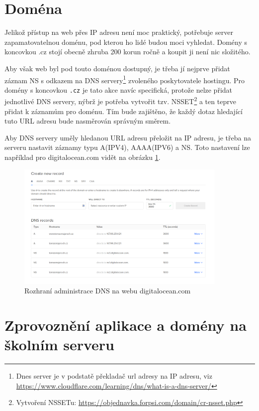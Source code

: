 \section{Doména}
Jelikož přístup na web přes IP adresu není moc praktický, potřebuje server zapamatovatelnou doménu, pod kterou ho lidé budou moci vyhledat. Domény s koncovkou .cz stojí obecně zhruba 200 korun ročně a koupit ji není nic složitého. 
\par Aby však web byl pod touto doménou dostupný, je třeba jí nejprve přidat záznam NS s odkazem na DNS servery\footnote{Dnes server je v podstatě překladač url adresy na IP adresu, viz \url{https://www.cloudflare.com/learning/dns/what-is-a-dns-server/}} zvoleného poskytovatele hostingu. Pro domény s koncovkou \texttt{.cz} je tato akce navíc specifická, protože nelze přidat jednotlivé DNS servery, nýbrž je potřeba vytvořit tzv. NSSET\footnote{Vytvoření NSSETu: \url{https://objednavka.forpsi.com/domain/cr-nsset.php}} a ten teprve přidat k záznamům pro doménu. Tím bude zajištěno, že každý dotaz hledající tuto URL adresu bude nasměrován správným směrem.

\par Aby DNS servery uměly hledanou URL adresu přeložit na IP adresu, je třeba na serveru nastavit záznamy typu A(IPV4), AAAA(IPV6) a NS. Toto nastavení lze například pro digitalocean.com vidět na obrázku \ref{fig:digitalocean-dns}.


\begin{figure}
    \centering
    \includegraphics[width=0.9\textwidth]{obrazky-figures/digitaloceanDNSadmin.png}
    \caption{Rozhraní administrace DNS na webu digitalocean.com}
    \label{fig:digitalocean-dns}
\end{figure}

\section{Zprovoznění aplikace a domény na školním serveru}

